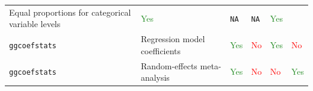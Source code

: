 \documentclass[
]{article}
\begin{document}
\begin{longtable}[]{@{}llllll@{}}
\begin{minipage}[t]{0.35\columnwidth}
Equal proportions for categorical variable levels\strut
\end{minipage} & \begin{minipage}[t]{0.08\columnwidth}\raggedright
\textcolor{ForestGreen}{Yes}\strut
\end{minipage} & \begin{minipage}[t]{0.10\columnwidth}\raggedright
\texttt{NA}\strut
\end{minipage} & \begin{minipage}[t]{0.08\columnwidth}\raggedright
\texttt{NA}\strut
\end{minipage} & \begin{minipage}[t]{0.10\columnwidth}\raggedright
\textcolor{ForestGreen}{Yes}\strut
\end{minipage}\tabularnewline
\begin{minipage}[t]{0.14\columnwidth}\raggedright
\texttt{ggcoefstats}\strut
\end{minipage} & \begin{minipage}[t]{0.35\columnwidth}\raggedright
Regression model coefficients\strut
\end{minipage} & \begin{minipage}[t]{0.08\columnwidth}\raggedright
\textcolor{ForestGreen}{Yes}\strut
\end{minipage} & \begin{minipage}[t]{0.10\columnwidth}\raggedright
\textcolor{red}{No}\strut
\end{minipage} & \begin{minipage}[t]{0.08\columnwidth}\raggedright
\textcolor{ForestGreen}{Yes}\strut
\end{minipage} & \begin{minipage}[t]{0.10\columnwidth}\raggedright
\textcolor{red}{No}\strut
\end{minipage}\tabularnewline
\begin{minipage}[t]{0.14\columnwidth}\raggedright
\texttt{ggcoefstats}\strut
\end{minipage} & \begin{minipage}[t]{0.35\columnwidth}\raggedright
Random-effects meta-analysis\strut
\end{minipage} & \begin{minipage}[t]{0.08\columnwidth}\raggedright
\textcolor{ForestGreen}{Yes}\strut
\end{minipage} & \begin{minipage}[t]{0.10\columnwidth}\raggedright
\textcolor{red}{No}\strut
\end{minipage} & \begin{minipage}[t]{0.08\columnwidth}\raggedright
\textcolor{red}{No}\strut
\end{minipage} & \begin{minipage}[t]{0.10\columnwidth}\raggedright
\textcolor{ForestGreen}{Yes}\strut
\end{minipage}\tabularnewline
\bottomrule
\end{longtable}
\end{document}
